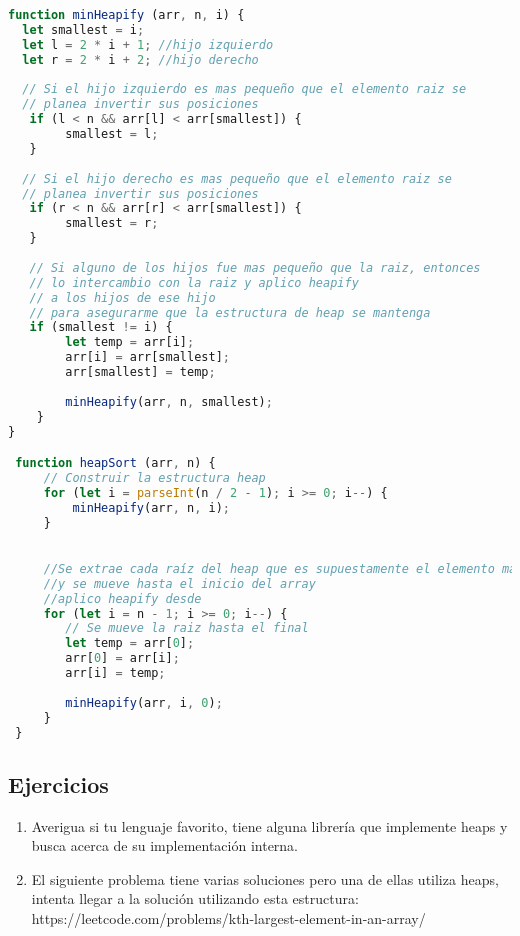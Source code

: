 \begin{lstlisting}[language=JavaScript, caption=Heap sort]
function minHeapify (arr, n, i) {
  let smallest = i;
  let l = 2 * i + 1; //hijo izquierdo
  let r = 2 * i + 2; //hijo derecho
  
  // Si el hijo izquierdo es mas pequeño que el elemento raiz se
  // planea invertir sus posiciones
   if (l < n && arr[l] < arr[smallest]) {
        smallest = l; 
   }
  
  // Si el hijo derecho es mas pequeño que el elemento raiz se
  // planea invertir sus posiciones
   if (r < n && arr[r] < arr[smallest]) {
        smallest = r; 
   }
  
   // Si alguno de los hijos fue mas pequeño que la raiz, entonces
   // lo intercambio con la raiz y aplico heapify 
   // a los hijos de ese hijo
   // para asegurarme que la estructura de heap se mantenga
   if (smallest != i) { 
        let temp = arr[i]; 
        arr[i] = arr[smallest]; 
        arr[smallest] = temp; 
  
        minHeapify(arr, n, smallest); 
    } 
}

 function heapSort (arr, n) { 
     // Construir la estructura heap 
     for (let i = parseInt(n / 2 - 1); i >= 0; i--) {
         minHeapify(arr, n, i); 
     }

  
     //Se extrae cada raíz del heap que es supuestamente el elemento mas pequeño
     //y se mueve hasta el inicio del array
     //aplico heapify desde 
     for (let i = n - 1; i >= 0; i--) { 
        // Se mueve la raiz hasta el final
        let temp = arr[0]; 
        arr[0] = arr[i]; 
        arr[i] = temp; 
  
        minHeapify(arr, i, 0); 
     } 
 }
\end{lstlisting}

\subsection{Ejercicios}

\begin{enumerate}
    \item Averigua si tu lenguaje favorito, tiene alguna librería que implemente heaps y busca acerca de su implementación interna.
    \item El siguiente problema tiene varias soluciones pero una de ellas utiliza heaps, intenta llegar a la solución utilizando esta estructura: https://leetcode.com/problems/kth-largest-element-in-an-array/
\end{enumerate}